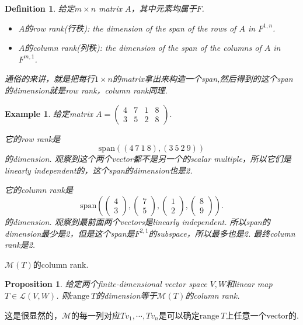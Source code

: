 \documentclass{article}
\newtheorem{proposition}[theorem]{Proposition}
\newtheorem{example}[theorem]{Example}
\newtheorem{definition}[theorem]{Definition}
\newcommand\range[1]{\text{range}\ #1}
\begin{document}
\begin{definition}
\rm 给定$m \times n$ matrix $A$，其中元素均属于$F$.
\begin{itemize}
	\item $A$的row rank(行秩): the dimension of the span of the rows of $A$ in $F^{1,n}$.
	\item $A$的column rank(列秩): the dimension of the span of the columns of $A$ in $F^{m,1}$.
\end{itemize}
通俗的来讲，就是把每行$1 \times n$的matrix拿出来构造一个span,然后得到的这个span的dimension就是row rank，column rank同理.
\end{definition}

\begin{example}
\rm 给定matrix $A=\begin{pmatrix} 4&7&1&8 \\ 3&5&2&8 \end{pmatrix}.$

它的row rank是
$$
\text{span}((4\ 7\ 1\ 8),(3\ 5\ 2\ 9))
$$
的dimension. 观察到这个两个vector都不是另一个的scalar multiple，所以它们是linearly independent的，这个span的dimension也是2.

它的column rank是
$$
\text{span}\left(\begin{pmatrix}4\\3\end{pmatrix},\begin{pmatrix}7\\5\end{pmatrix},\begin{pmatrix}1\\2\end{pmatrix},\begin{pmatrix}8\\9\end{pmatrix}\right).
$$
的dimension. 观察到最前面两个vectors是linearly independent. 所以span的dimension最少是2，但是这个span是$F^{2,1}$的subspace，所以最多也是2. 最终column rank是2.
\end{example}

{\color{red} $\mathcal{M}(T)$的column rank}.

\begin{proposition}
\rm 给定两个finite-dimensional vector space $V,W$和linear map $T \in \mathcal{L}(V,W)$. 则$\range{T}$的dimension等于$\mathcal{M}(T)$的column rank.
\end{proposition}

这是很显然的，$\mathcal{M}$的每一列对应$Tv_1,\cdots,Tv_n$是可以确定$\range{T}$上任意一个vector的.
\end{document}
